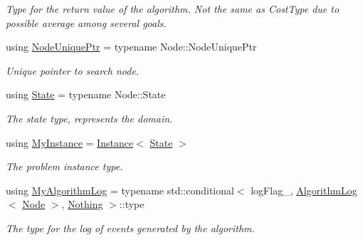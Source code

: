 \begin{DoxyCompactItemize}
\begin{DoxyCompactList}\small\item\em Type for the return value of the algorithm. Not the same as Cost\+Type due to possible average among several goals. \end{DoxyCompactList}\item 
using \hyperlink{structBaseTraits_a409bd1556a83b8660d959e61d587dcf7}{Node\+Unique\+Ptr} = typename Node\+::\+Node\+Unique\+Ptr\hypertarget{structBaseTraits_a409bd1556a83b8660d959e61d587dcf7}{}\label{structBaseTraits_a409bd1556a83b8660d959e61d587dcf7}

\begin{DoxyCompactList}\small\item\em Unique pointer to search node. \end{DoxyCompactList}\item 
using \hyperlink{structBaseTraits_a2f5d44e72cc0ce05aeb0031c7ea9a1f9}{State} = typename Node\+::\+State\hypertarget{structBaseTraits_a2f5d44e72cc0ce05aeb0031c7ea9a1f9}{}\label{structBaseTraits_a2f5d44e72cc0ce05aeb0031c7ea9a1f9}

\begin{DoxyCompactList}\small\item\em The state type, represents the domain. \end{DoxyCompactList}\item 
using \hyperlink{structBaseTraits_adaabd19138615952927e32f3e5b7d557}{My\+Instance} = \hyperlink{structInstance}{Instance}$<$ \hyperlink{structBaseTraits_a2f5d44e72cc0ce05aeb0031c7ea9a1f9}{State} $>$\hypertarget{structBaseTraits_adaabd19138615952927e32f3e5b7d557}{}\label{structBaseTraits_adaabd19138615952927e32f3e5b7d557}

\begin{DoxyCompactList}\small\item\em The problem instance type. \end{DoxyCompactList}\item 
using \hyperlink{structBaseTraits_a2074a1699e6283c58edd09d832913262}{My\+Algorithm\+Log} = typename std\+::conditional$<$ log\+Flag\+\_\+, \hyperlink{structAlgorithmLog}{Algorithm\+Log}$<$ \hyperlink{structBaseTraits_a219add24a6d21da59549d69e7d50c317}{Node} $>$, \hyperlink{structNothing}{Nothing} $>$\+::type\hypertarget{structBaseTraits_a2074a1699e6283c58edd09d832913262}{}\label{structBaseTraits_a2074a1699e6283c58edd09d832913262}

\begin{DoxyCompactList}\small\item\em The type for the log of events generated by the algorithm. \end{DoxyCompactList}\end{DoxyCompactItemize}


